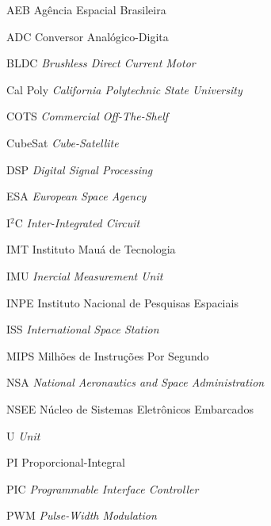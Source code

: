 \documentclass[
	12pt,				%
	openany,			%
	twoside,			%
	a4paper,			%
	english,			%
	french,				%
	spanish,			%
	brazil,				%
	oldfontcommands
	]{abntex2}
\begin{document}
\listoffigures*
\cleardoublepage

\listoftables*
\cleardoublepage

\begin{siglas}

  \item[AEB] {Agência Espacial Brasileira}
  \item[ADC] {Conversor Analógico-Digita}
  \item[BLDC] \textit{Brushless Direct Current Motor}
  \item[Cal Poly] \textit{California Polytechnic State University}
  \item[COTS] \textit{Commercial Off-The-Shelf}
  \item[CubeSat] \textit{Cube-Satellite}
  \item[DSP] \textit{Digital Signal Processing}
  \item[ESA] \textit{European Space Agency}
  \item[I$^{2}$C] \textit{Inter-Integrated Circuit}
  \item[IMT] {Instituto Mauá de Tecnologia}
  \item[IMU] \textit{Inercial Measurement Unit}
  \item[INPE] {Instituto Nacional de Pesquisas Espaciais}
  \item[ISS] \textit{International Space Station}
  \item[MIPS] {Milhões de Instruções Por Segundo}
  \item[NSA] \textit{National Aeronautics and Space Administration}
  \item[NSEE] {Núcleo de Sistemas Eletrônicos Embarcados}
  \item[U] \textit{Unit}
  \item[PI] {Proporcional-Integral}
  \item[PIC] \textit{Programmable Interface Controller}
  \item[PWM] \textit{Pulse-Width Modulation}
    
\end{siglas}

\end{document}
